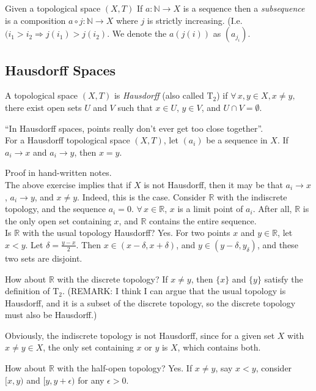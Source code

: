\documentclass[12pt]{report}
\newcommand{\exercise}{ \noindent{\sc Exercise }\hspace{5pt} }
\newcommand{\define}{  \noindent{\sc Definition }\hspace{5pt} }
\newcommand{\fall}{\forall\,}
\newcommand{\reals}{\mathbb{R}}
\newcommand{\naturals}{\mathbb{N}}
\newcommand{\T}[1]{$\textrm{T}_#1$}
\begin{document}
\define Given a topological space $(X,T)$ If $a:\naturals \rightarrow X$ is a
sequence then a  {\em subsequence} is a composition
$a \circ j: \naturals \rightarrow X$ where $j$ is strictly increasing.
(I.e. $(i_1 > i_2 \Rightarrow j(i_1) > j(i_2)$. We denote the 
$a(j(i))$ as $(a_{j_i})$.


\subsection{Hausdorff Spaces}
\define A topological space $(X,T)$ is {\em Hausdorff} (also called {\em \T{2}}) 
if $\fall x,y \in X, x \neq y,$ there exist open sets $U$ and $V$ such that $x
\in U$, $y \in V$, and $U \cap V = \emptyset$.

``In Hausdorff spaces, points really don't ever get too close together''. \\

\exercise For a Hausdorff topological space $(X, T)$, let $(a_i)$ be a
sequence in $X$. If $a_i \rightarrow x$ and $a_i \rightarrow y$, then $x = y$.

Proof in hand-written notes.\\

The above exercise implies that if $X$ is not Hausdorff, then it may be that
$a_i \rightarrow x$, $a_i \rightarrow y$, and $x \neq y$. Indeed, this is the
case. Consider $\reals$ with the indiscrete topology, and the sequence $a_i =
0$. $\fall x \in \reals$, $x$ is a limit point of $a_i$. After all, $\reals$
is the only open set containing $x$, and $\reals$ contains the entire
sequence.\\

Is $\reals$ with the usual topology Hausdorff? Yes.  For two points $x$
and $y \in \reals$, let $x < y$. Let $\delta = \frac{y - x}{2}$. Then $x \in
(x-\delta,x+\delta)$, and $y \in (y-\delta, y_\delta)$, and these two sets are
disjoint. 

How about $\reals$ with the discrete topology? If $x \neq y$, then $\{x\}$ and
$\{y\}$ satisfy the definition of \T{2}. (REMARK: I think I can argue that the
usual topology is Hausdorff, and it is a subset of the discrete topology, so
the discrete topology must also be Hausdorff.)

Obviously, the indiscrete topology is not Hausdorff, since for a given set $X$
with $x \neq y \in X$, the only set containing $x$ or $y$ is $X$, which
contains both.

How about $\reals$ with the half-open topology? Yes. If $x \neq y$, say $x <
y$, consider $[x,y)$ and $[y,y+\epsilon)$ for any $\epsilon > 0$.\\
\end{document}
